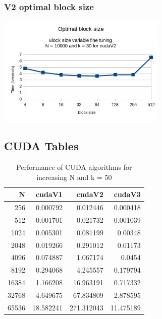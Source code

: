 \documentclass[11pt]{article}
\begin{document}
\subsubsection{V2 optimal block size}
\label{sec:orge1a60e4}
\begin{center}
\includegraphics[height=200]{./images/block-size-effect.png}
\end{center}
\pagebreak
\subsection{CUDA Tables}
\label{sec:org5104863}
\begin{table}[htbp]
\caption{Performance of CUDA algorithms for increasing N and k = 50}
\centering
\begin{tabular}{rrrr}
\hline
N & cudaV1 & cudaV2 & cudaV3\\[0pt]
\hline
256 & 0.000792 & 0.012446 & 0.000418\\[0pt]
512 & 0.001701 & 0.021732 & 0.001039\\[0pt]
1024 & 0.005301 & 0.081199 & 0.00348\\[0pt]
2048 & 0.019266 & 0.291012 & 0.01173\\[0pt]
4096 & 0.074887 & 1.067174 & 0.0454\\[0pt]
8192 & 0.294068 & 4.245557 & 0.179794\\[0pt]
16384 & 1.166208 & 16.963191 & 0.717332\\[0pt]
32768 & 4.649675 & 67.834809 & 2.878595\\[0pt]
65536 & 18.582241 & 271.312043 & 11.475189\\[0pt]
\hline
\end{tabular}
\end{table}
\end{document}
